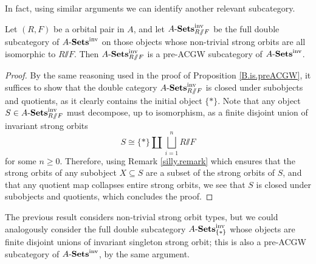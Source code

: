 \documentclass[11pt]{amsart}
\renewcommand{\ss}{\mathord{\sslash}}
\begin{document}
In fact, using similar arguments we can identify another relevant subcategory.

\begin{proposition}\label{prop.single.ambit.type}
    Let $(R,F)$ be a orbital pair in $A$, %
    and let $\ASets^\inv_{R\ss F}$ be the full double subcategory of $A\text{-}\mathbf{Sets}^{\mathrm{inv}}$ on those objects whose non-trivial strong orbits are all isomorphic to $R\ss F$. Then $\ASets^\inv_{R\ss F}$ is a pre-ACGW subcategory of $A\text{-}\mathbf{Sets}^{\mathrm{inv}}$.
\end{proposition}

\begin{proof}
    By the same reasoning used in the proof of Proposition \ref{B.is.preACGW}, it suffices to show that the double category $\ASets^\inv_{R\ss F}$ is closed under subobjects and quotients, as it clearly contains the initial object $\{*\}$. Note that any object $S\in\ASets^\inv_{R\ss F}$ must decompose, up to isomorphism, as a finite disjoint union of invariant strong orbits \[S\cong \{*\}\amalg\bigsqcup_{i=1}^n R\ss F\] for some $n\geq 0$. Therefore, using Remark \ref{silly.remark} which ensures that the strong orbits of any subobject  $X\subseteq S$ are a subset of the strong orbits of $S$, and that any quotient map collapses entire strong orbits, we see that $S$ is closed under subobjects and quotients, which concludes the proof. 
\end{proof}

\begin{remark}\label{rmk.trivial.ambit.type}
    The previous result considers non-trivial strong orbit types, but we could analogously consider the full double subcategory $A\text{-}\mathbf{Sets}^{\mathrm{inv}}_{\{*\}}$ whose objects are finite disjoint unions of invariant singleton strong orbit; this is also a pre-ACGW subcategory of $A\text{-}\mathbf{Sets}^{\mathrm{inv}}$, by the same argument.
\end{remark}



\end{document}
